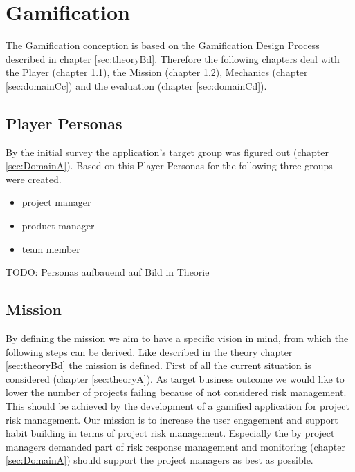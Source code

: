 \newpage

\section{Gamification}
\label{sec:domainC}


The Gamification conception is based on the Gamification Design Process described in chapter \ref{sec:theoryBd}. Therefore the following chapters deal with the Player (chapter \ref{sec:domainCa}), the Mission (chapter \ref{sec:domainCb}), Mechanics (chapter \ref{sec:domainCc}) and the evaluation (chapter \ref{sec:domainCd}).

\subsection{Player Personas}
\label{sec:domainCa}

By the initial survey the application's target group was figured out (chapter \ref{sec:DomainA}). Based on this Player Personas for the following three groups were created.

\begin{itemize}
	\item project manager
	\item product manager
	\item team member
\end{itemize}

TODO: Personas aufbauend auf Bild in Theorie

\subsection{Mission}
\label{sec:domainCb}

By defining the mission we aim to have a specific vision in mind, from which the following steps can be derived. Like described in the theory chapter \ref{sec:theoryBd} the mission is defined. 
First of all the current situation is considered (chapter \ref{sec:theoryA}). As target business outcome we would like to lower the number of projects failing because of not considered risk management. This should be achieved by the development of a gamified application for project risk management.
Our mission is to increase the user engagement and support habit building in terms of project risk management. Especially the by project managers demanded part of risk response management and monitoring (chapter \ref{sec:DomainA}) should support the project managers as best as possible.

